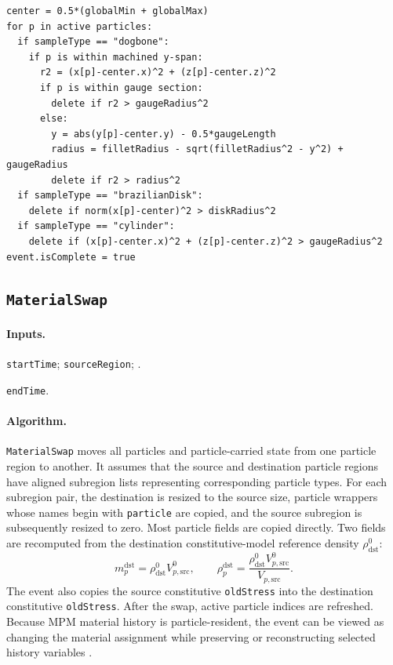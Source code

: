 \begin{lstlisting}[caption={MachineSample event pseudocode.}]
center = 0.5*(globalMin + globalMax)
for p in active particles:
  if sampleType == "dogbone":
    if p is within machined y-span:
      r2 = (x[p]-center.x)^2 + (z[p]-center.z)^2
      if p is within gauge section:
        delete if r2 > gaugeRadius^2
      else:
        y = abs(y[p]-center.y) - 0.5*gaugeLength
        radius = filletRadius - sqrt(filletRadius^2 - y^2) + gaugeRadius
        delete if r2 > radius^2
  if sampleType == "brazilianDisk":
    delete if norm(x[p]-center)^2 > diskRadius^2
  if sampleType == "cylinder":
    delete if (x[p]-center.x)^2 + (z[p]-center.z)^2 > gaugeRadius^2
event.isComplete = true
\end{lstlisting}

\subsection{\texttt{MaterialSwap}}
\label{subsec:event-material-swap}

\paragraph{Inputs.}
\begin{description}[leftmargin=*,style=nextline]
\item[\textbf{Required.}] \texttt{startTime}; \texttt{sourceRegion}; .
\item[\textbf{Optional.}] \texttt{endTime}.
\end{description}

\paragraph{Algorithm.}
\texttt{MaterialSwap} moves all particles and particle-carried state from one particle region to another.  It assumes that the source and destination particle regions have aligned subregion lists representing corresponding particle types.  For each subregion pair, the destination is resized to the source size, particle wrappers whose names begin with \texttt{particle} are copied, and the source subregion is subsequently resized to zero.  Most particle fields are copied directly.  Two fields are recomputed from the destination constitutive-model reference density $\rho^0_{\mathrm{dst}}$:
\begin{equation}
  m^{\mathrm{dst}}_p = \rho^0_{\mathrm{dst}} V^0_{p,\mathrm{src}},
  \qquad
  \rho^{\mathrm{dst}}_p = \frac{\rho^0_{\mathrm{dst}}V^0_{p,\mathrm{src}}}{V_{p,\mathrm{src}}}.
\end{equation}
The event also copies the source constitutive \texttt{oldStress} into the destination constitutive \texttt{oldStress}.  After the swap, active particle indices are refreshed.  Because MPM material history is particle-resident, the event can be viewed as changing the material assignment while preserving or reconstructing selected history variables \cite{sulsky1994history,steffen2008choices}.

